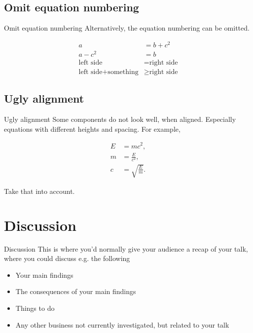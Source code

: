 \documentclass{beamer}
\begin{document}
\subsection{Omit equation numbering}
\begin{frame}{Omit equation numbering}
Alternatively, the equation numbering can be omitted.

\begin{align*} %
a&=b+c^2\\
a-c^2&=b\\
\text{left side} &= \text{right side}\\
\text{left side} + \text{something} & \geq \text{right side}
\end{align*}

\end{frame}

\subsection{Ugly alignment}
\begin{frame}{Ugly alignment}
Some components do not look well, when aligned. Especially equations with different heights and spacing. For example, 

\begin{align}
E&=mc^2,\\
m&=\frac{E}{c^2},\\
c&=\sqrt{\frac{E}{m}}.
\end{align}

Take that into account. 
\end{frame}

\section{Discussion}
\begin{frame}{Discussion}
This is where you'd normally give your audience a recap of your talk, where you could
discuss e.g. the following

\begin{itemize}
\item Your main findings
\item The consequences of your main findings
\item Things to do
\item Any other business not currently investigated, but related to your talk
\end{itemize}

\end{frame}
\end{document}
